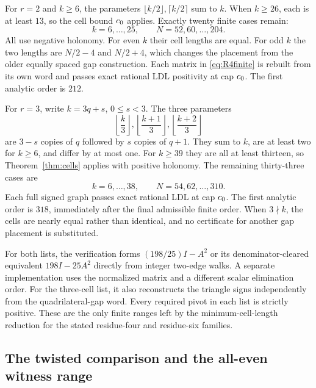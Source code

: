 For $r=2$ and $k\ge6$, the parameters
$\lfloor k/2\rfloor,\lceil k/2\rceil$ sum to $k$.
When $k\ge26$, each is at least $13$, so the cell bound $c_0$ applies.
Exactly twenty finite cases remain:
\begin{equation}
 k=6,\ldots,25,\qquad N=52,60,\ldots,204.
 \label{eq:R4finite}
\end{equation}
All use negative holonomy. For even $k$ their cell lengths are equal.
For odd $k$ the two lengths are $N/2-4$ and $N/2+4$, which changes the
placement from the older equally spaced gap construction. Each matrix in
\eqref{eq:R4finite} is rebuilt from its own word and passes exact rational
LDL positivity at cap $c_0$. The first analytic order is $212$.

For $r=3$, write $k=3q+s$, $0\le s<3$. The three parameters
\[
 \left\lfloor\frac{k}{3}\right\rfloor,
 \left\lfloor\frac{k+1}{3}\right\rfloor,
 \left\lfloor\frac{k+2}{3}\right\rfloor
\]
are $3-s$ copies of $q$ followed by $s$ copies of $q+1$.
They sum to $k$, are at least two for $k\ge6$, and differ by at most one.
For $k\ge39$ they are all at least thirteen, so Theorem~\ref{thm:cells}
applies with positive holonomy. The remaining thirty-three cases are
\begin{equation}
 k=6,\ldots,38,\qquad N=54,62,\ldots,310.
 \label{eq:R6finite}
\end{equation}
Each full signed graph passes exact rational LDL at cap $c_0$.
The first analytic order is $318$, immediately after the final admissible
finite order. When $3\nmid k$, the cells are nearly equal rather than
identical, and no certificate for another gap placement is substituted.

For both lists, the verification forms $(198/25)I-A^2$ or its
denominator-cleared equivalent $198I-25A^2$ directly from integer
two-edge walks. A separate implementation uses the normalized matrix and
a different scalar elimination order. For the three-cell list,
it also reconstructs the triangle signs independently from the
quadrilateral-gap word. Every required pivot in each list is strictly
positive. These are the only finite ranges left by the minimum-cell-length
reduction for the stated residue-four and residue-six families.

\subsection{The twisted comparison and the all-even witness range}

